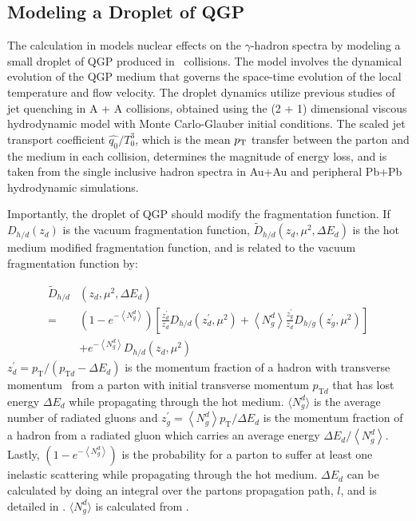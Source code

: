 \FloatBarrier
\subsection{Modeling a Droplet of QGP}
The calculation in \cite{Xie2021} models nuclear effects on the $\gamma$-hadron spectra by modeling a small droplet of QGP produced in \pPb~collisions. The model involves the dynamical evolution of the QGP medium that governs the space-time evolution of the local temperature and flow velocity. The droplet dynamics utilize previous studies of jet quenching in A + A collisions, obtained using the (2 + 1) dimensional viscous hydrodynamic model with Monte Carlo-Glauber initial conditions. The scaled jet transport coefficient $\hat{q_0}/T^3_0$, which is the mean $p_{\mathrm{T}}$ transfer between the parton and the medium in each collision, determines the magnitude of energy loss, and is taken from the single inclusive hadron spectra in Au+Au and peripheral Pb+Pb hydrodynamic simulations. 

Importantly, the droplet of QGP should modify the fragmentation function. If $D_{h / d}\left(z_{d}\right)$ is the vacuum fragmentation function, $\tilde{D}_{h / d}\left(z_{d}, \mu^{2}, \Delta E_{d}\right)$ is the hot medium modified fragmentation function, and is related to the vacuum fragmentation function by:

\begin{equation}
  \begin{aligned}
    \tilde{D}_{h / d} &\left(z_{d}, \mu^{2}, \Delta E_{d}\right) \\
    =&\left(1-e^{-\left\langle N_{g}^{d}\right\rangle}\right)\left[\frac{z_{d}^{\prime}}{z_{d}} D_{h / d}\left(z_{d}^{\prime}, \mu^{2}\right)+\left\langle N_{g}^{d}\right\rangle \frac{z_{g}^{\prime}}{z_{d}} D_{h / g}\left(z_{g}^{\prime}, \mu^{2}\right)\right] \\
     &+e^{-\left\langle N_{g}^{d}\right\rangle} D_{h / d}\left(z_{d}, \mu^{2}\right)
  \end{aligned}
\end{equation}
$z_{d}^{\prime}=p_{\mathrm{T}} /\left(p_{\mathrm{T} d}-\Delta E_{d}\right)$ is the momentum fraction of a hadron with transverse momentum \pt~from a parton with initial transverse momentum $p_{\mathrm{T}d}$ that has lost energy $\Delta E_d$ while propagating through the hot medium.  $\langle N_g^d \rangle$ is the average number of radiated gluons and $z_{g}^{\prime}=\left\langle N_{g}^{d}\right\rangle p_{\mathrm{T}} / \Delta E_{d}$ is the momentum fraction of a hadron from a radiated gluon which carries an average energy $\Delta E_{d} /\left\langle N_{g}^{d}\right\rangle$. Lastly, $\left(1-e^{-\left\langle N_{g}^{d}\right\rangle}\right)$ is the probability for a parton to suffer at least one inelastic scattering while propagating through the hot medium. $\Delta E_{d}$ can be calculated by doing an integral over the partons propagation path, $l$, and is detailed in \cite{Wang2002}. $\langle N_g^d \rangle$ is calculated from \cite{Chang2014}.

